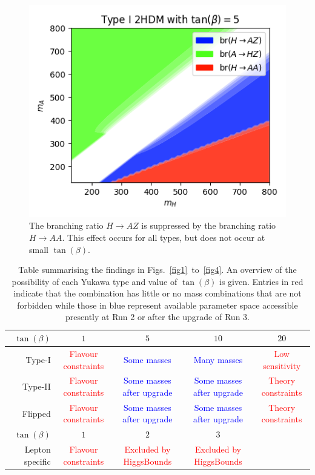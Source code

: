 \begin{figure}[t!]
	\centering
    \includegraphics[width=.5\textwidth]{branching_ratios_HAA.png}
    \caption{The branching ratio \(H\rightarrow AZ\) is suppressed by the branching ratio \(H\rightarrow AA\).
             This effect occurs for all types, but does not occur at small \(\tan(\beta)\).}\label{figsuppress}
\end{figure}


\begin{table}
\begin{tabularx}{\textwidth}{RCCCC}
      \toprule
      \textcolor{black}{\(\tan(\beta)\)}& \textcolor{black}{\(1\)} & \textcolor{black}{\(5\)} & \textcolor{black}{\(10\)} & \textcolor{black}{\(20\)}\\
      \toprule
      Type-I & \textcolor{red}{Flavour constraints} & \textcolor{blue}{Some masses} & \textcolor{blue}{Many masses} & \textcolor{red}{Low sensitivity} \\
      \hline
      Type-II &\textcolor{red}{Flavour constraints} & \textcolor{blue}{Some masses after upgrade} & \textcolor{blue}{Some masses after upgrade} & \textcolor{red}{Theory constraints}\\
      \hline
      Flipped &\textcolor{red}{Flavour constraints} & \textcolor{blue}{Some masses after upgrade} & \textcolor{blue}{Some masses after upgrade} & \textcolor{red}{Theory constraints}\\
      \toprule
      \textcolor{black}{\(\tan(\beta)\)}& \textcolor{black}{\(1\)} & \textcolor{black}{\(2\)} & \textcolor{black}{\(3\)} & \\
      \toprule
      Lepton specific & \textcolor{red}{Flavour constraints} & \textcolor{red}{Excluded by HiggsBounds} &  \textcolor{red}{Excluded by HiggsBounds} & \\
\end{tabularx}
\caption{Table summarising the findings in Figs.~\ref{fig1}~to~\ref{fig4}.
An overview of the possibility of each Yukawa type and value of \(\tan(\beta)\) is given.
Entries in red indicate that the combination has little or no mass combinations that are not forbidden while those in blue represent available parameter space accessible presently at Run 2  or after the upgrade of Run 3.}
\label{tab:summary}
\end{table}

